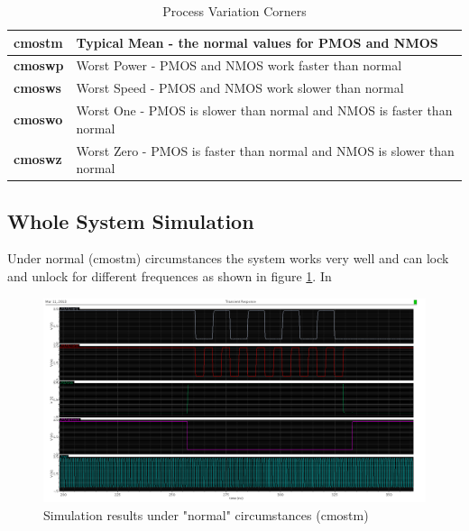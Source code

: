 \documentclass[a4paper,12pt]{article} \usepackage{graphicx}
\begin{document}
\begin{table}[h]
        \centering
        \begin{tabular}{|l|l|}
                \hline 
                \textbf{cmostm} & Typical Mean - the normal values for PMOS and NMOS \\
                \hline 
                \textbf{cmoswp} & Worst Power - PMOS and NMOS work faster than normal \\
                \hline 
                \textbf{cmosws} & Worst Speed - PMOS and NMOS work slower than normal \\
                \hline 
                \textbf{cmoswo} & Worst One - PMOS is slower than normal and NMOS is
                faster than normal \\
                \hline 
                \textbf{cmoswz} & Worst Zero - PMOS is faster than normal and NMOS is
                slower than normal \\
                \hline
        \end{tabular}
        \caption{Process Variation Corners}
        \label{tab:corners}
\end{table}

\subsection{Whole System Simulation}
Under normal (cmostm) circumstances the system works very well and can
lock and unlock for different frequences as shown in figure
\ref{fig:WS_sim_tm}. In

\begin{figure}[h]
  \centering
  \includegraphics[width=\textwidth]{../Bilder/WS_sim_tm.png}
  \caption{Simulation results under "normal" circumstances (cmostm)}
  \label{fig:WS_sim_tm}
\end{figure}
\end{document}

